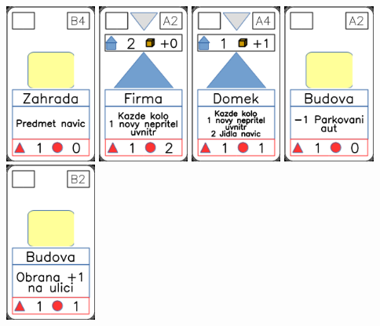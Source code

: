 \documentclass[a4paper]{article}
\begin{document}
	\includegraphics[width=3.0cm]{img-2_23}
	\includegraphics[width=3.0cm]{img-3_16}
	\includegraphics[width=3.0cm]{img-3_3}
	\includegraphics[width=3.0cm]{img-2_1}
	\includegraphics[width=3.0cm]{img-2_6}
\end{document}
